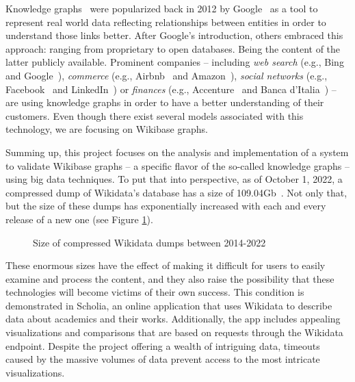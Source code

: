 Knowledge graphs~\cite{https://doi.org/10.48550/arxiv.2110.11709} were popularized back in 2012 by Google~\cite{web:knowledge_graphs:google} as a tool to represent real world data reflecting relationships between entities in order to understand those links better. After Google's introduction, others embraced this approach: ranging from proprietary to open databases. Being the content of the latter publicly available. Prominent companies -- including \textit{web search} (e.g., Bing~\cite{knowledge:graphs:usage:bing} and Google~\cite{web:knowledge_graphs:google}), \textit{commerce} (e.g., Airbnb~\cite{knowledge:graphs:usage:airbnb} and Amazon~\cite{knowledge:graphs:usage:amazon}), \textit{social networks} (e.g., Facebook~\cite{knowledge:graphs:usage:facebook} and LinkedIn~\cite{knowledge:graphs:usage:linkedin}) or \textit{finances} (e.g., Accenture~\cite{knowledge:graphs:usage:accenture} and Banca d'Italia~\cite{https://doi.org/10.48550/arxiv.2010.05172}) -- are using knowledge graphs in order to have a better understanding of their customers. Even though there exist several models associated with this technology, we are focusing on Wikibase graphs.

Summing up, this project focuses on the analysis and implementation of a system to validate Wikibase graphs -- a specific flavor of the so-called knowledge graphs -- using big data techniques. To put that into perspective, as of October 1, 2022, a compressed \gls{dump} of Wikidata's database has a size of 109.04Gb~\cite{wikidata:dumps}. Not only that, but the size of these dumps has exponentially increased with each and every release of a new one (see Figure \ref{fig:dumps}).

\begin{figure}[ht]
    \centering
    
    \caption[Plot showing the size of compressed dumps between 2014-22]{Size of compressed Wikidata dumps between 2014-2022~\cite{https://doi.org/10.48550/arxiv.2110.11709}}
    \label{fig:dumps}
\end{figure}

These enormous sizes have the effect of making it difficult for users to easily examine and process the content, and they also raise the possibility that these technologies will become victims of their own success. This condition is demonstrated in Scholia, an online application that uses Wikidata to describe data about academics and their works. Additionally, the app includes appealing visualizations and comparisons that are based on requests through the Wikidata endpoint. Despite the project offering a wealth of intriguing data, timeouts caused by the massive volumes of data prevent access to the most intricate visualizations.

